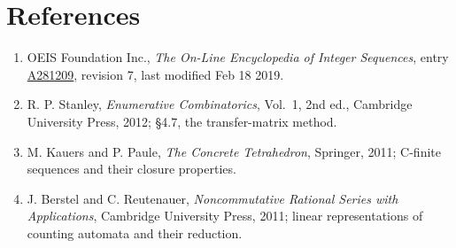\documentclass[11pt]{article}
\theoremstyle{definition}
\begin{document}
\section{References}

\begin{enumerate}

\item OEIS Foundation Inc., \emph{The On-Line Encyclopedia of Integer Sequences}, entry \href{https://oeis.org/A281209}{A281209}, revision 7, last modified Feb 18 2019.

\item R. P. Stanley, \emph{Enumerative Combinatorics}, Vol.~1, 2nd ed., Cambridge University Press, 2012; \S4.7, the transfer-matrix method.

\item M. Kauers and P. Paule, \emph{The Concrete Tetrahedron}, Springer, 2011; C-finite sequences and their closure properties.

\item J. Berstel and C. Reutenauer, \emph{Noncommutative Rational Series with Applications}, Cambridge University Press, 2011; linear representations of counting automata and their reduction.

\end{enumerate}
\end{document}
